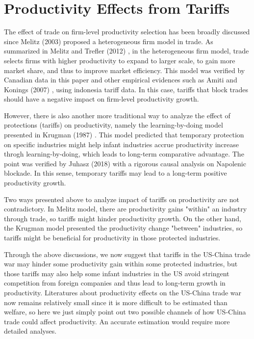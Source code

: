 \documentclass[12pt]{article}
\begin{document}
\section{Productivity Effects from Tariffs}
\label{sec:productivity}
The effect of trade on firm-level productivity selection has been broadly discussed since Melitz (2003) \cite{melitz2003impact} proposed a heterogeneous firm model in trade.
As summarized in Melitz and Trefler (2012) \cite{melitz2012gains}, in the heterogeneous firm model, trade selects firms with higher productivity to expand to larger scale, to gain more market share, and thus to improve market efficiency. 
This model was verified by Canadian data in this paper and other empirical evidences such as Amiti and Konings (2007) \cite{amiti2007trade}, using indonesia tariff data.
In this case, tariffs that block trades should have a negative impact on firm-level productivity growth. 

However, there is also another more traditional way to analyze the effect of protections (tariffs) on productivity, namely the learning-by-doing model presented in Krugman (1987) \cite{krugman1987narrow}. 
This model predicted that temporary protection on specific industries might help infant industries accrue productivity increase throgh learning-by-doing, which leads to long-term comparative advantage.
The point was verified by Juhasz (2018) \cite{juhasz2018temporary} with a rigorous causal analysis on Napolenic blockade.
In this sense, temporary tariffs may lead to a long-term positive productivity growth.

Two ways presented above to analyze impact of tariffs on productivity are not contradictory. 
In Melitz model, there are productivity gains "within" an industry through trade, so tariffs might hinder productivity growth.
On the other hand, the Krugman model presented the productivity change "between" industries, so tariffs might be beneficial for productivity in those protected industries.

Through the above discussions, we now suggest that tariffs in the US-China trade war may hinder some productivity gain within some protected industries, 
but those tariffs may also help some infant industries in the US avoid stringent competition from foreign companies and thus lead to long-term growth in productivity. 
Literatures about productivity effects on the US-China trade war now remains relatively small since it is more difficult to be estimated than welfare, 
so here we just simply point out two possible channels of how US-China trade could affect productivity. An accurate estimation would require more detailed analyses.
\end{document}
